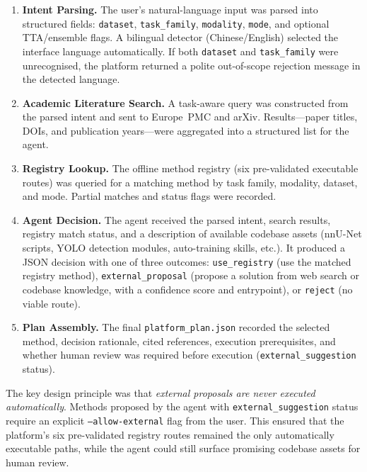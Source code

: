 \begin{enumerate}
    \item \textbf{Intent Parsing.} The user's natural-language input was parsed
    into structured fields: \texttt{dataset}, \texttt{task\_family},
    \texttt{modality}, \texttt{mode}, and optional TTA/ensemble flags. A
    bilingual detector (Chinese/English) selected the interface language
    automatically. If both \texttt{dataset} and \texttt{task\_family} were
    unrecognised, the platform returned a polite out-of-scope rejection message
    in the detected language.

    \item \textbf{Academic Literature Search.} A task-aware query was constructed
    from the parsed intent and sent to Europe~PMC and arXiv. Results---paper
    titles, DOIs, and publication years---were aggregated into a structured list
    for the agent.

    \item \textbf{Registry Lookup.} The offline method registry (six pre-validated
    executable routes) was queried for a matching method by task family, modality,
    dataset, and mode. Partial matches and status flags were recorded.

    \item \textbf{Agent Decision.} The agent received the parsed intent, search
    results, registry match status, and a description of available codebase assets
    (nnU-Net scripts, YOLO detection modules, auto-training skills, etc.).
    It produced a JSON decision with one of three outcomes:
    \texttt{use\_registry} (use the matched registry method),
    \texttt{external\_proposal} (propose a solution from web search or codebase
    knowledge, with a confidence score and entrypoint),
    or \texttt{reject} (no viable route).

    \item \textbf{Plan Assembly.} The final \texttt{platform\_plan.json} recorded
    the selected method, decision rationale, cited references, execution
    prerequisites, and whether human review was required before execution
    (\texttt{external\_suggestion} status).
\end{enumerate}

The key design principle was that \textit{external proposals are never executed
automatically}. Methods proposed by the agent with \texttt{external\_suggestion}
status require an explicit \texttt{---allow-external} flag from the user. This
ensured that the platform's six pre-validated registry routes remained the only
automatically executable paths, while the agent could still surface promising
codebase assets for human review.


